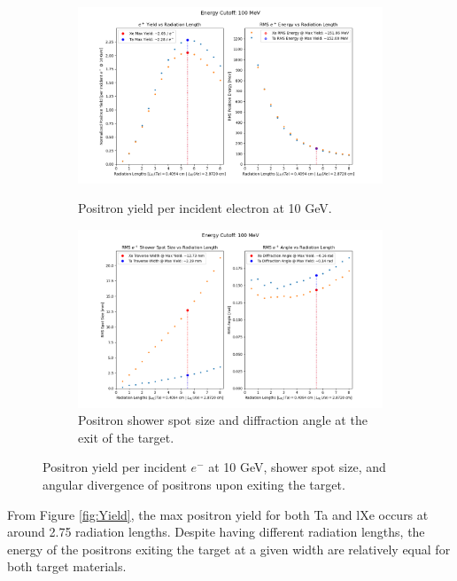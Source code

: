 \documentclass[%
reprint,
amsmath, amssymb,
aps,
floatfix,
]{revtex4-2}
\begin{document}

\begin{figure}[H]
    \begin{subfigure}{.5\textwidth}
        \includegraphics[height = .5\linewidth]{../images/CompYield.png}
        \caption{\label{fig:Yield} Positron yield per incident electron at 10 GeV.}
        \includegraphics[height = .5\linewidth]{../images/CompATW.png}
        \caption{\label{fig:ATW}Positron shower spot size and diffraction angle at the exit of the target.}
    \end{subfigure}
    \caption{\label{fig:Comps}Positron yield per incident $e^-$ at 10 GeV, 
    shower spot size, and angular divergence of positrons upon exiting the target.}
\end{figure}
From Figure \ref{fig:Yield}, the max positron yield for both Ta and lXe occurs at around 2.75 radiation lengths.
Despite having different radiation lengths, the energy of the positrons exiting the
target at a given width are relatively equal for both target materials.
\end{document}
